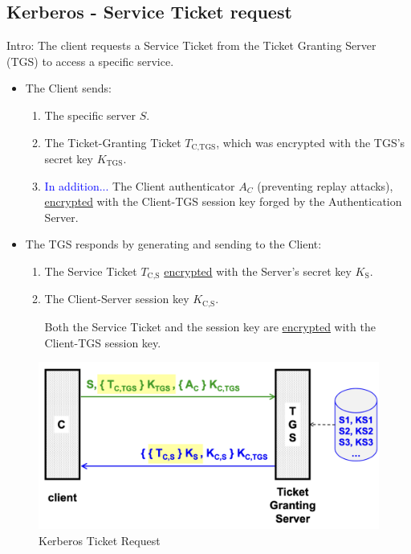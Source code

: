 \subsection*{Kerberos - Service Ticket request}
Intro: The client requests a Service Ticket from the Ticket Granting Server (TGS) to access a specific service.

\begin{itemize}
    \item The Client sends:
    \begin{enumerate}
        \item The specific server $S$.
        \item The Ticket-Granting Ticket $T_{\text{C,TGS}}$, which was encrypted with the TGS's secret key $K_{\text{TGS}}$.
        \item \textcolor{Blue}{In addition...} The Client authenticator $A_C$ (preventing replay attacks), \underline{encrypted} with the Client-TGS session key forged by the Authentication Server.
    \end{enumerate} 
    \item The TGS responds by generating and sending to the Client:
    \begin{enumerate}
        \item The Service Ticket $T_{\text{C,S}}$ \underline{encrypted} with the Server's secret key $K_{\text{S}}$.
        \item The Client-Server session key $K_{\text{C,S}}$.
        
        \begin{center}
            Both the Service Ticket and the session key are \underline{encrypted} with the Client-TGS session key.

        \end{center}
    \end{enumerate}
\end{itemize}

\begin{figure}[H]
    \centering
    \includegraphics[width=0.5\linewidth]{Images/Authentication/kerticketreq.png}
    \caption{Kerberos Ticket Request}
\end{figure}

